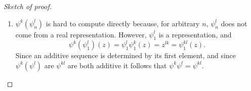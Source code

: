 \documentclass{article}
\newcommand{\C}{\mathbb{C}}
\renewcommand{\to}{\longrightarrow}
\theoremstyle{definition}
\begin{document}
\begin{proof}[Sketch of proof]
\begin{enumerate}
Now a bundle is determined by its transition functions with respect to some open cover; the point of this construction is that the bundle $E$ having transition functions $g_{\alpha \beta}: V_\alpha \cap V_\beta \to U(n)$ w.r.t.\ $\{V_\alpha\}_{\alpha \in I}$ is replaced by the bundle with transition functions $V_\alpha \cap V_\beta \stackrel{g_{\alpha \beta}}{\to} U(n) \stackrel{\Theta_n}{\to} U(n_1)$ w.r.t.\ the same cover.
From this point of view it is clear that $\hat \varphi (\hat \theta(E)) = P(P(E) \times_{U(n)} \C^{n_1}) \times_{U(n_1)} \C^{n_2}$ is the bundle with transition functions \[V_\alpha \cap V_\beta \stackrel{g_{\alpha \beta}}{\to} U(n) \stackrel{\Theta_n}{\to} U(n_1) \stackrel{\Phi_{n_1}}{\to} U(n_2),\] which is the same as  $P(E) \times_{U(n)} \C^{n_2}$, where $U_n$ acts on $\C^{n_2}$ via the composite $\Phi_{n_1}\circ\Theta_n$. This coincides with $\widehat{\varphi(\theta)} (E)$, as $\varphi(\theta_n):=\Theta_n^*\varphi_{n_1}$, which is the same representation of $U(n)$ on $\C^{n_2}$ as $\Phi_{n_1}\circ\Theta_n$.





%
\item $\psi^k(\psi^l_n)$ is hard to compute directly because, for arbitrary $n$, $\psi^l_n$ does not come from a real representation.  However, $\psi^l_1$ is a representation, and \[\psi^k(\psi^l_1)(z) = \psi^l_1 \psi^k_1(z) = z^{lk} = \psi^{kl}_1(z).\]  Since an additive sequence is determined by its first element, and since $\psi^k(\psi^l)$ are $\psi^{kl}$ are both additive it follows that $\psi^k \psi^l = \psi^{kl}$.\qedhere
\end{enumerate}
\end{proof}
\end{document}
